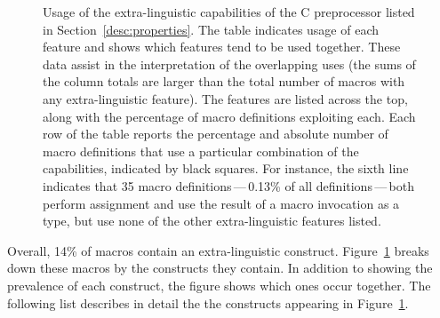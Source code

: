 \documentclass[10pt]{article}
\newcommand{\captionsmall}[1]{\caption[]{\small #1}}
\begin{document}
\begin{figure}
  \vspace*{.6in}
  {\small\centerline{}}
  
  \captionsmall{Usage of the extra-linguistic capabilities of the C
    preprocessor listed in Section~\ref{desc:properties}.  The table
    indicates usage of each feature and shows which features tend
    to be used together.  These data assist in the interpretation of the overlapping
    uses (the sums of the column totals are larger than the total number of
    macros with any extra-linguistic feature).
    The features are listed across the top, along with the percentage of
    macro definitions exploiting each.  Each row of the table reports the
    percentage and absolute number of macro definitions that use a particular combination
    of the capabilities, indicated by black squares.  For instance, the
    sixth line indicates that 35 macro definitions\,---\,0.13\% of all
    definitions\,---\,both perform assignment and use the result of a macro
    invocation as a type, but use none of the other extra-linguistic
    features listed.}

  \label{fig:subset-properties}
\end{figure}


Overall, 14\% of macros contain an extra-linguistic construct.
Figure~\ref{fig:subset-properties} breaks down these macros by the
constructs they contain.  In addition to showing the prevalence of each
construct, the figure shows which ones occur together.  The following list
describes in detail the the constructs appearing in
Figure~\ref{fig:subset-properties}.

\label{desc:properties}
\end{document}
